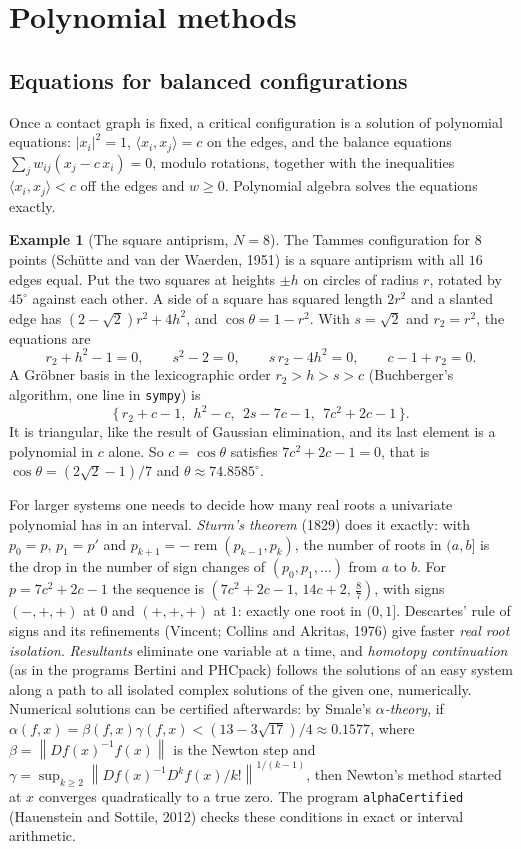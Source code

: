 \documentclass[11pt,openany]{book}
\theoremstyle{plain}
\theoremstyle{definition}
\newtheorem{example}[theorem]{Example}
\theoremstyle{remark}
\newcommand{\abs}[1]{\left\lvert #1 \right\rvert}
\newcommand{\norm}[1]{\left\lVert #1 \right\rVert}
\newcommand{\ip}[2]{\langle #1, #2\rangle}
\begin{document}
\section{Polynomial methods}
\label{COMP:sec:poly}

\subsection{Equations for balanced configurations}
Once a contact graph is fixed, a critical configuration is a solution of polynomial equations:
$\abs{x_i}^2=1$, $\ip{x_i}{x_j}=c$ on the edges, and the balance equations
$\sum_jw_{ij}(x_j-c\,x_i)=0$, modulo rotations, together with the inequalities $\ip{x_i}{x_j}<c$ off the
edges and $w\ge0$. Polynomial algebra solves the equations exactly.

\begin{example}[The square antiprism, $N=8$]
The Tammes configuration for $8$ points (Sch\"utte and van der Waerden, 1951) is a square antiprism with
all $16$ edges equal. Put the two squares at heights $\pm h$ on circles of radius $r$, rotated by
$45^\circ$ against each other. A side of a square has squared length $2r^2$ and a slanted edge has
$(2-\sqrt2)r^2+4h^2$, and $\cos\theta=1-r^2$. With $s=\sqrt2$ and $r_2=r^2$, the equations are
\[
  r_2+h^2-1=0,\qquad s^2-2=0,\qquad s\,r_2-4h^2=0,\qquad c-1+r_2=0 .
\]
A Gr\"obner basis in the lexicographic order $r_2>h>s>c$ (Buchberger's algorithm, one line in
\texttt{sympy}) is
\[
  \{\,r_2+c-1,\ \ h^2-c,\ \ 2s-7c-1,\ \ 7c^2+2c-1\,\}.
\]
It is triangular, like the result of Gaussian elimination, and its last element is a polynomial in $c$
alone. So $c=\cos\theta$ satisfies $7c^2+2c-1=0$, that is $\cos\theta=(2\sqrt2-1)/7$ and
$\theta\approx74.8585^\circ$.
\end{example}

For larger systems one needs to decide how many real roots a univariate polynomial has in an
interval. \emph{Sturm's theorem} (1829) does it exactly: with $p_0=p$, $p_1=p'$ and
$p_{k+1}=-\operatorname{rem}(p_{k-1},p_k)$, the number of roots in $(a,b]$ is the drop in the number of sign
changes of $(p_0,p_1,\dots)$ from $a$ to $b$. For $p=7c^2+2c-1$ the sequence is $(7c^2+2c-1,\,14c+2,\,\frac87)$,
with signs $(-,+,+)$ at $0$ and $(+,+,+)$ at $1$: exactly one root in $(0,1]$. Descartes' rule of signs
and its refinements (Vincent; Collins and Akritas, 1976) give faster \emph{real root isolation}.
\emph{Resultants} eliminate one variable at a time, and \emph{homotopy continuation} (as in the programs
Bertini and PHCpack) follows the solutions of an easy system along a path to all isolated complex solutions
of the given one, numerically. Numerical solutions can be certified afterwards: by Smale's
\emph{$\alpha$-theory}, if $\alpha(f,x)=\beta(f,x)\gamma(f,x)<(13-3\sqrt{17})/4\approx0.1577$, where
$\beta=\norm{Df(x)^{-1}f(x)}$ is the Newton step and
$\gamma=\sup_{k\ge2}\norm{Df(x)^{-1}D^kf(x)/k!}^{1/(k-1)}$, then Newton's method started at $x$ converges
quadratically to a true zero. The program \texttt{alphaCertified} (Hauenstein and Sottile, 2012) checks
these conditions in exact or interval arithmetic.
\end{document}
